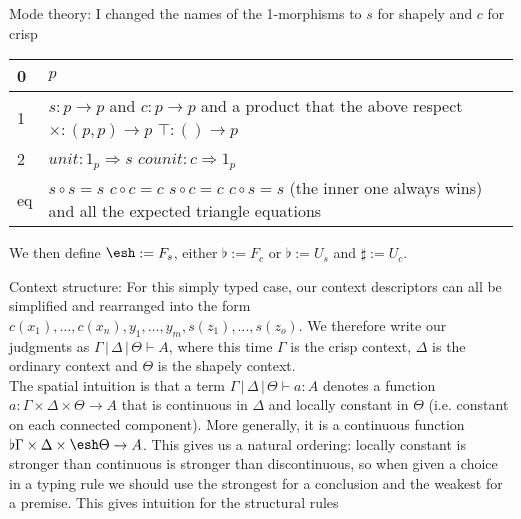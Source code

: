 \documentclass[a4paper,12pt]{article}
\newcommand{\yields}{\vdash}
\newcommand{\cbar}{\, | \,}
\newcommand{\shape}{\ensuremath{\mathord{\raisebox{0.5pt}{\text{\rm\esh}}}}}
\begin{document}
Mode theory: I changed the names of the 1-morphisms to $s$ for shapely and $c$ for crisp
\begin{center}
  \begin{tabular}{| l | l |}
    \hline
    0 & $p$ \\
    \hline
    1 & \pbox{20cm}{
      $s : p \to p$ and $c : p \to p$ \\
      and a product that the above respect \\
      $\times : (p, p) \to p$ \hspace{2ex} $\top : () \to p$
    }\\
    \hline
    2 & $unit : 1_p \Rightarrow s$ \hspace{2ex} $counit : c \Rightarrow 1_p$ \\
    \hline
     eq & \pbox{20cm}{\vspace{1ex}
       $s \circ s = s$ \\
       $c \circ c = c$ \\
       $s \circ c = c$ \\
       $c \circ s = s$ \\
       (the inner one always wins) \\
        and all the expected triangle equations
    }\\
    \hline
  \end{tabular}
\end{center}
We then define $\shape := F_s$, either $\flat := F_c$ or $\flat := U_s$ and $\sharp := U_c$.

Context structure: For this simply typed case, our context descriptors can all be simplified and rearranged into the form $c(x_1) , \dots , c(x_n) , y_1 , \dots , y_m , s(z_1) , \dots , s(z_o)$. We therefore write our judgments as $\Gamma \cbar \Delta \cbar \Theta \yields A$, where this time $\Gamma$ is the crisp context, $\Delta$ is the ordinary context and $\Theta$ is the shapely context.\\
The spatial intuition is that a term $\Gamma\cbar\Delta\cbar\Theta\yields a : A$ denotes a function $a : \Gamma\times\Delta\times\Theta\to A$ that is continuous in $\Delta$ and locally constant in $\Theta$ (i.e. constant on each connected component). More generally, it is a continuous function $\flat\Gamma\times\Delta\times\shape\Theta \to A$. This gives us a natural ordering: locally constant is stronger than continuous is stronger than discontinuous, so when given a choice in a typing rule we should use the strongest for a conclusion and the weakest for a premise. This gives intuition for the structural rules
\end{document}
